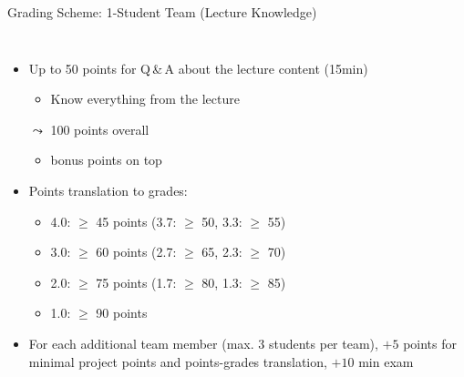 \documentclass[aspectratio=169]{../latex_main/tntbeamer}  %
\begin{document}
\begin{frame}[c]{Grading Scheme: 1-Student Team (Lecture Knowledge)}


\begin{columns}


\vspace*{-2.3em}
   \begin{itemize}
		\item Up to 50 points for Q\,\&\,A about the lecture content (15min)
            \begin{itemize}
                \item Know everything from the lecture
            \end{itemize}
             
		\item[$\leadsto$] 100 points overall
		\begin{itemize}
		    \item bonus points on top
		\end{itemize}
		\medskip
		\item Points translation to grades:
		\begin{itemize}
		    \item 4.0: $\geq$ 45 points (3.7: $\geq$ 50, 3.3: $\geq$ 55)
		    \item 3.0: $\geq$ 60 points (2.7: $\geq$ 65, 2.3: $\geq$ 70)
		    \item 2.0: $\geq$ 75 points (1.7: $\geq$ 80, 1.3: $\geq$ 85)
    		\item 1.0: $\geq$ 90 points
		\end{itemize}
		\medskip
            \pause
		\item \alert{For each additional team member (max. 3 students per team), $+5$ points for minimal project points and points-grades translation, $+10$ min exam}
	\end{itemize}



\end{columns}
     
\end{frame}
\end{document}
